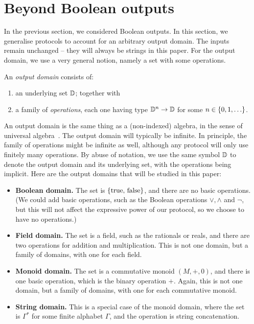 \section{Beyond Boolean outputs}
\label{sec:beyond-boolean-outputs}

In the previous section, we considered Boolean outputs. In this section, we generalise protocols to account for an arbitrary output domain. The inputs remain unchanged -- they will always be strings in this paper.  For the output domain, we use a very general notion, namely a set with some operations. 
\begin{definition}
    An \emph{output domain} consists of: 
    \begin{enumerate}
        \item an underlying set $\mathbb D$; together with
        \item a family of \emph{operations}, each one having  type $\mathbb D^n \to \mathbb D$ for some $n \in \{0,1,\ldots\}$.
    \end{enumerate}
\end{definition}
An output domain is the same thing as a (non-indexed) algebra, in the sense of universal algebra~\cite[p.5]{hobby1988structure}. 
The output domain will typically  be infinite. In principle, the family of operations might be infinite as well, although any protocol will only use finitely many operations.
By abuse of notation, we use the same symbol $\mathbb D$ to denote the output domain and its underlying set, with the operations being implicit. Here are the output domains that will be studied in this paper: 
\begin{itemize}
    \item \textbf{Boolean domain.} The set is $\{\text{true, false}\}$, and there are no basic operations. (We could add basic operations, such as the Boolean operations $\lor,\land$ and $\neg$, but this will not affect the expressive power of our protocol, so we choose to have no operations.)
    \item \textbf{Field domain.} The set is a field, such as the rationals or reals, and there are two operations for addition and multiplication. This is not one domain, but a family of domains, with one for each field.
    \item \textbf{Monoid domain.} The set is a commutative monoid $(M,+,0)$, and there is one basic operation, which is the binary operation $+$. Again, this is not one domain, but a family of domains, with one for each commutative monoid.
    \item \textbf{String domain.} This is a special case of the monoid domain, where the set is $\Gamma^*$ for some finite alphabet $\Gamma$, and the operation is string concatenation.
\end{itemize}

